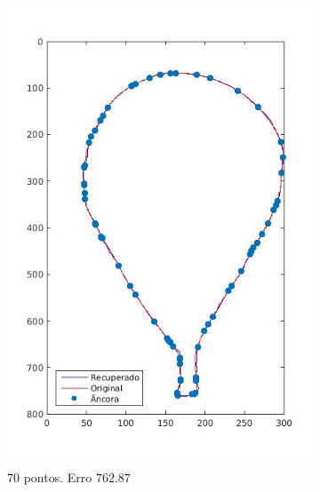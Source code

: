 \begin{figure}[ht!]
\begin{subfigure}[t]{0.31\textwidth}
		\includegraphics[width=\textwidth]{img/curv70.jpg}
		\caption{70 pontos. Erro $762.87$}
		\label{fig:ex32}
	\end{subfigure}
	\hfill
	\begin{subfigure}[t]{0.31\textwidth}
		\centering

\end{subfigure}
\end{figure}
